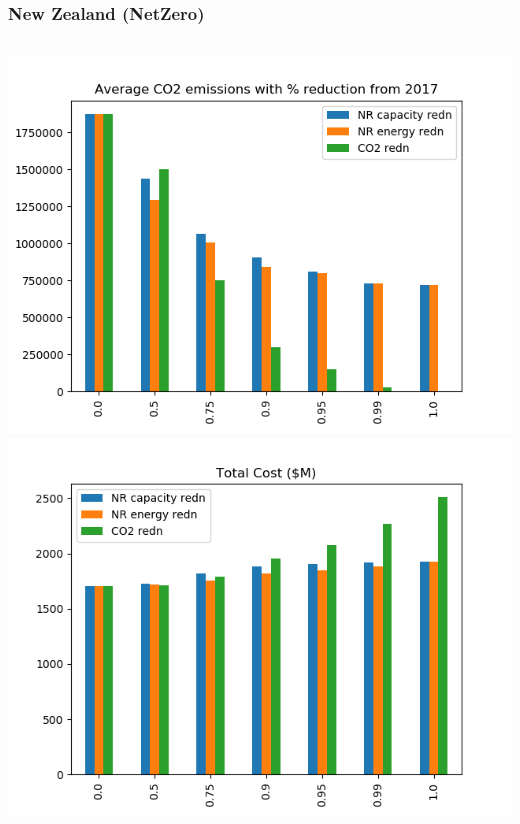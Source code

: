 \documentclass[xcolor=dvipsnames]{beamer}
\begin{document}
\begin{frame}
  \frametitle{New Zealand (NetZero)}

  \begin{columns}[T]
    \begin{column}{0.4\linewidth}
      \includegraphics[width=\textwidth]{includes/TotalCarbonv20.png}
      \\
      \includegraphics[width=\textwidth]{includes/TotalCostMv20.png}
    \end{column}


\end{columns}
\end{frame}
\end{document}

